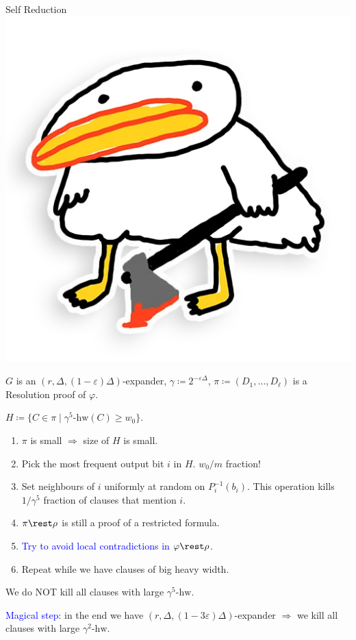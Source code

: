 \begin{frame}{Self Reduction \hspace{0.2cm} \includegraphics[scale = 0.03]{pics/utia-blood.png}}

    $G$ is an $(r, \Delta, (1 - \varepsilon) \Delta)$-expander, $\gamma \coloneqq 2^{-\varepsilon \Delta}$,
    $\pi \coloneqq (D_1, \dots, D_{\ell})$ is a Resolution proof of $\varphi$.

    $H \coloneqq \{C \in \pi \mid \gamma^5\text{-}\mathrm{hw}(C) \ge w_0 \}$.

    \begin{enumerate}
        \item $\pi$ is small $\Rightarrow$ size of $H$ is small.
        \pause
        \item Pick the most frequent output bit $i$ in $H$. \alert{$w_0 / m$ fraction!}
        \pause
        \item Set \alert{neighbours} of $i$ uniformly at random on $P_i^{-1}(b_i)$. This
            operation kills \alert{$1 / \gamma^5$ fraction} of clauses that mention $i$.
        \pause
        \item $\pi \rest \rho$ is still a proof of a restricted formula.
        \pause
        \item \textcolor{blue}{Try to avoid local contradictions in $\varphi \rest \rho$.}
        \pause    
        \item Repeat while we have clauses of big \alert{heavy width}.
    \end{enumerate}

    \pause
    \vspace{0.3cm}
    We do NOT kill all clauses with large $\gamma^5\text{-}\mathrm{hw}$.

    \vspace{0.3cm}
    \pause
    \textcolor{blue}{Magical step}: in the end we have $(r, \Delta, (1 - 3 \varepsilon) \Delta)$-expander
    $\Rightarrow$ we kill all clauses with large $\gamma^2\text{-}\mathrm{hw}$.
\end{frame}